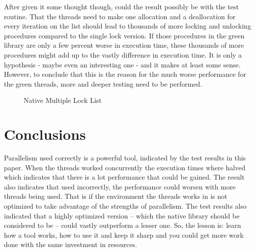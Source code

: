 \documentclass{article}
\begin{document}
After given it some thought though, could the result possibly be with the test routine. That the threads need to make one allocation and a deallocation for every iteration on the list should lead to thousands of more locking and unlocking procedures compared to the single lock version. If those procedures in the green library are only a few percent worse in execution time, these thousands of more procedures might add up to the vastly difference in execution time. It is only a hypothesis - maybe even an interesting one - and it makes at least some sense. However, to conclude that this is the reason for the much worse performance for the green threads, more and deeper testing need to be performed.

\begin{figure}
\hspace{4em}
\caption{Native Multiple Lock List}
\end{figure}

\section{Conclusions}\label{conclusions}

Parallelism used correctly is a powerful tool, indicated by the test results in this paper. When the threads worked concurrently the execution times where halved which indicates that there is a lot performance that could be gained. The result also indicates that used incorrectly, the performance could worsen with more threads being used. That is if the environment the threads works in is not optimized to take advantage of the strengths of parallelism. The test results also indicated that a highly optimized version – which the native library should be considered to be – could vastly outperform a lesser one. So, the lesson is: learn how a tool works, how to use it and keep it sharp and you could get more work done with the same investment in resources.
\end{document}
